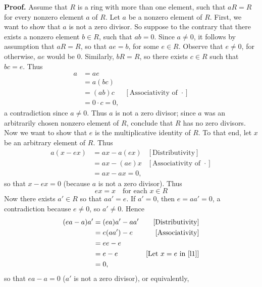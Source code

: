 \documentclass[9pt]{article}
\begin{document}
\begin{enumerate}
      \textbf{Proof.} Assume that $R$ is a ring with more than one element, such
      that $aR = R$ for every nonzero element $a$ of $R$. Let $a$ be a nonzero
      element of $R$. First, we want to show that $a$ is not a zero divisor. So
      suppose to the contrary that there exists a nonzero element $b \in R$, such
      that $ab = 0$. Since $a \neq 0$, it follows by assumption that $aR = R$,
      so that $ae = b$, for some $e \in R$. Observe that $e \neq 0$, for
      otherwise, $ae$ would be 0. Similarly, $bR = R$, so there exists $c \in R$
      such that $bc = e$. Thus
      \begin{align*}
         a &= ae \\
           &= a(bc) \\
           &= (ab)c &[\text{Associativity of } \cdot] \\
           &= 0 \cdot c = 0,
      \end{align*}
      a contradiction since $a \neq 0$. Thus $a$ is not a zero divisor; since
      $a$ was an arbitrarily chosen nonzero element of $R$, conclude that $R$
      has no zero divisors. Now we want to show that $e$ is the multiplicative
      identity of $R$. To that end, let $x$ be an arbitrary element of $R$.
      Thus
      \begin{align*}
         a(x - ex) &= ax - a(ex) &[\text{Distributivity}] \\
            &= ax - (ae)x &[\text{Associativity of }\cdot] \\
            &= ax - a x = 0,
      \end{align*}
      so that $x - ex = 0$ (because $a$ is not a zero divisor). Thus
      \begin{equation} \label{l1}
         ex = x \quad \text{for each } x \in R
      \end{equation}
      Now there exists $a' \in R$ so that $aa' = e$. If $a' = 0$, then
      $e = aa' = 0$, a contradiction because $e \neq 0$, so $a' \neq 0$. Hence
      \begin{align*}
         (ea - a)a' &= (ea)a' - aa' &[\text{Distributivity}] \\
            &= e(aa') - e &[\text{Associativity}] \\
            &= ee - e \\
            &= e - e &[\text{Let }x = e \text{ in }\eqref{l1}] \\
            &= 0,
      \end{align*}
      so that $ea - a = 0$ ($a'$ is not a zero divisor), or equivalently,

\end{enumerate}
\end{document}
